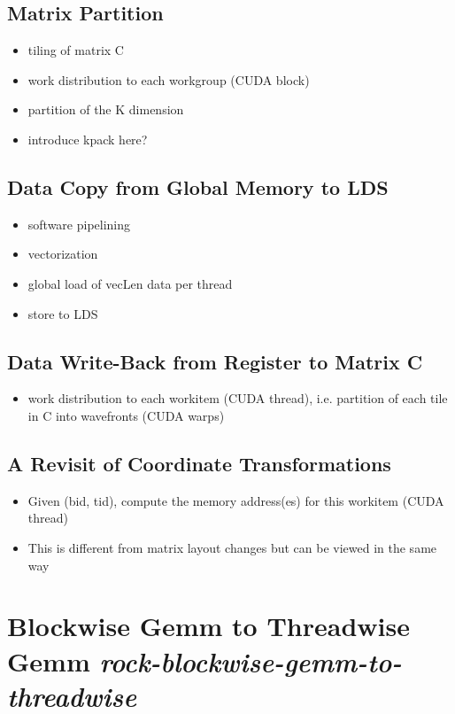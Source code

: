 \subsection{Matrix Partition}

\begin{itemize}
\item tiling of matrix C
\item work distribution to each workgroup (CUDA block)
\item partition of the K dimension
\item introduce kpack here?
\end{itemize}

\subsection{Data Copy from Global Memory to LDS}

\begin{itemize}
\item software pipelining
\item vectorization
\item global load of vecLen data per thread
\item store to LDS
\end{itemize}

\subsection{Data Write-Back from Register to Matrix C}

\begin{itemize}
\item work distribution to each workitem (CUDA thread),
  i.e. partition of each tile in C into wavefronts (CUDA warps)
\end{itemize}

\subsection{A Revisit of Coordinate Transformations}

\begin{itemize}
\item Given (bid, tid), compute the memory address(es) for this workitem (CUDA thread)
\item This is different from matrix layout changes but can be viewed in the same way
\end{itemize}

\section{Blockwise Gemm to Threadwise Gemm \emph{rock-blockwise-gemm-to-threadwise}}

